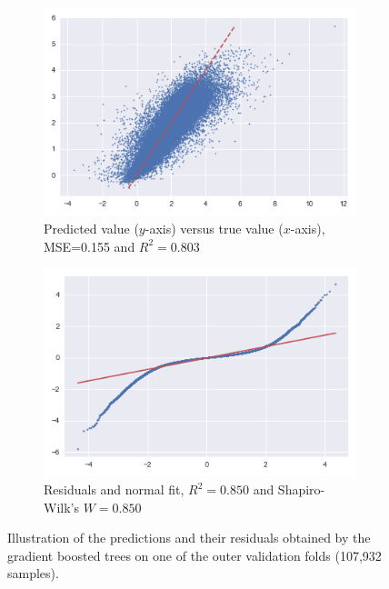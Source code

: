 \documentclass[a4paper]{book}
\begin{document}
\begin{figure}
    \centering
    \begin{subfigure}[t]{0.49\textwidth}
        \centering
        \includegraphics[width=\textwidth]{images/residuals_scatter}
        \caption{Predicted value ($y$-axis) versus true value ($x$-axis), MSE=0.155 and $R^2=0.803$}
        \label{fig:residuals_scatter}
    \end{subfigure}
    \hfill
    \begin{subfigure}[t]{0.49\textwidth}
        \centering
        \includegraphics[width=\textwidth]{images/residuals_probplot}
        \caption{Residuals and normal fit, $R^2=0.850$ and Shapiro-Wilk's $W=0.850$}
        \label{fig:residuals_probplot}
    \end{subfigure}
    \caption{Illustration of the predictions and their residuals obtained by the gradient boosted trees on one of the outer validation folds (107,932 samples).}
	\label{fig:residuals}
\end{figure}
\end{document}
